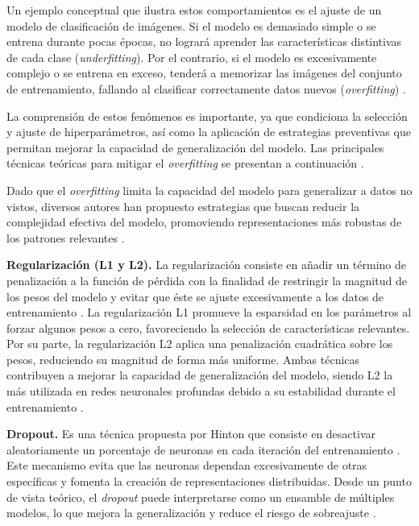 	\begin{flushleft}
		Un ejemplo conceptual que ilustra estos comportamientos es el ajuste de un modelo de clasificación de imágenes. Si el modelo es demasiado simple o se entrena durante pocas épocas, no logrará aprender las características distintivas de cada clase (\textit{underfitting}). Por el contrario, si el modelo es excesivamente complejo o se entrena en exceso, tenderá a memorizar las imágenes del conjunto de entrenamiento, fallando al clasificar correctamente datos nuevos (\textit{overfitting}) \cite{goodfellow2016dl, chollet2021, geron2019}.
		
		La comprensión de estos fenómenos es importante, ya que condiciona la selección y ajuste de hiperparámetros, así como la aplicación de estrategias preventivas que permitan mejorar la capacidad de generalización del modelo. Las principales técnicas teóricas para mitigar el \textit{overfitting} se presentan a continuación \cite{hinton2012}.
		
		Dado que el \textit{overfitting} limita la capacidad del modelo para generalizar a datos no vistos, diversos autores han propuesto estrategias que buscan reducir la complejidad efectiva del modelo, promoviendo representaciones más robustas de los patrones relevantes \cite{goodfellow2016dl, bishop2006}.
		
		\textbf{Regularización (L1 y L2).} La regularización consiste en añadir un término de penalización a la función de pérdida con la finalidad de restringir la magnitud de los pesos del modelo y evitar que éste se ajuste excesivamente a los datos de entrenamiento \cite{goodfellow2016dl}. La regularización L1 promueve la esparsidad en los parámetros al forzar algunos pesos a cero, favoreciendo la selección de características relevantes. Por su parte, la regularización L2 aplica una penalización cuadrática sobre los pesos, reduciendo su magnitud de forma más uniforme. Ambas técnicas contribuyen a mejorar la capacidad de generalización del modelo, siendo L2 la más utilizada en redes neuronales profundas debido a su estabilidad durante el entrenamiento \cite{krogh1992}.
		
		\textbf{Dropout.} Es una técnica propuesta por Hinton que consiste en desactivar aleatoriamente un porcentaje de neuronas en cada iteración del entrenamiento \cite{srivastava2014}. Este mecanismo evita que las neuronas dependan excesivamente de otras específicas y fomenta la creación de representaciones distribuidas. Desde un punto de vista teórico, el \textit{dropout} puede interpretarse como un ensamble de múltiples modelos, lo que mejora la generalización y reduce el riesgo de sobreajuste \cite{goodfellow2016dl}.
		

\end{flushleft}
